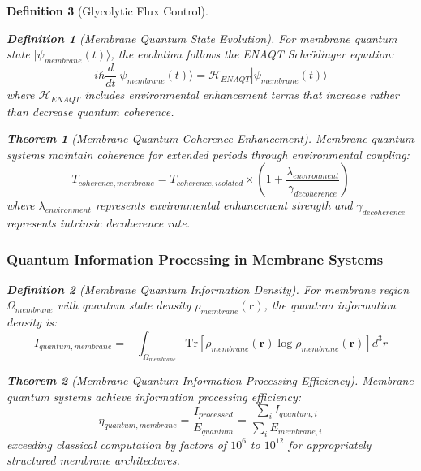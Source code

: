 \documentclass[12pt,a4paper]{article}
\newtheorem{theorem}{Theorem}
\newtheorem{definition}{Definition}
\begin{document}
\begin{definition}[Glycolytic Flux Control]
\begin{definition}[Membrane Quantum State Evolution]
For membrane quantum state $|\psi_{membrane}(t)\rangle$, the evolution follows the ENAQT Schrödinger equation:
\begin{equation}
i\hbar \frac{d}{dt} |\psi_{membrane}(t)\rangle = \mathcal{H}_{ENAQT} |\psi_{membrane}(t)\rangle
\end{equation}
where $\mathcal{H}_{ENAQT}$ includes environmental enhancement terms that increase rather than decrease quantum coherence.
\end{definition}

\begin{theorem}[Membrane Quantum Coherence Enhancement]
Membrane quantum systems maintain coherence for extended periods through environmental coupling:
\begin{equation}
T_{coherence,membrane} = T_{coherence,isolated} \times \left(1 + \frac{\lambda_{environment}}{\gamma_{decoherence}}\right)
\end{equation}
where $\lambda_{environment}$ represents environmental enhancement strength and $\gamma_{decoherence}$ represents intrinsic decoherence rate.
\end{theorem}

\subsubsection{Quantum Information Processing in Membrane Systems}

\begin{definition}[Membrane Quantum Information Density]
For membrane region $\Omega_{membrane}$ with quantum state density $\rho_{membrane}(\mathbf{r})$, the quantum information density is:
\begin{equation}
I_{quantum,membrane} = -\int_{\Omega_{membrane}} \text{Tr}[\rho_{membrane}(\mathbf{r}) \log \rho_{membrane}(\mathbf{r})] d^3r
\end{equation}
\end{definition}

\begin{theorem}[Membrane Quantum Information Processing Efficiency]
Membrane quantum systems achieve information processing efficiency:
\begin{equation}
\eta_{quantum,membrane} = \frac{I_{processed}}{E_{quantum}} = \frac{\sum_i I_{quantum,i}}{\sum_i E_{membrane,i}}
\end{equation}
exceeding classical computation by factors of $10^6$ to $10^{12}$ for appropriately structured membrane architectures.
\end{theorem}


\end{definition}
\end{document}
